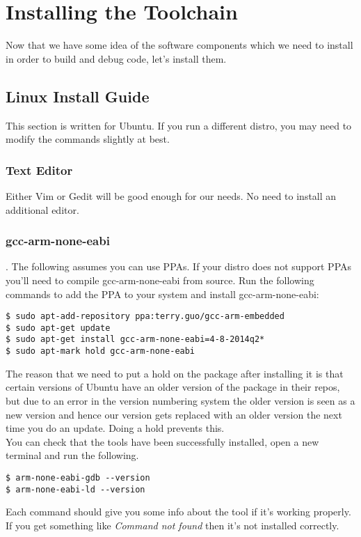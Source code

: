 \chapter{Installing the Toolchain}
Now that we have some idea of the software components which we need to install in order to build and debug code, let's install them.

\section{Linux Install Guide}
This section is written for Ubuntu. If you run a different distro, you may need to modify the commands slightly at best.
\subsection{Text Editor}
Either Vim or Gedit will be good enough for our needs. No need to install an additional editor.

\subsection{gcc-arm-none-eabi}.
The following assumes you can use PPAs. If your distro does not support PPAs you'll need to compile gcc-arm-none-eabi from source.
Run the following commands to add the PPA to your system and install gcc-arm-none-eabi:
\begin{lstlisting}[style=BashStyle]
$ sudo apt-add-repository ppa:terry.guo/gcc-arm-embedded
$ sudo apt-get update
$ sudo apt-get install gcc-arm-none-eabi=4-8-2014q2*
$ sudo apt-mark hold gcc-arm-none-eabi
\end{lstlisting}
The reason that we need to put a hold on the package after installing it is that certain versions of Ubuntu have an older version of the package in their repos, but due to an error in the version numbering system the older version is seen as a new version and hence our version gets replaced with an older version the next time you do an update. Doing a hold prevents this. \\

You can check that the tools have been successfully installed, open a new terminal and run the following. 
\begin{lstlisting}[style=BashStyle]
$ arm-none-eabi-gdb --version
$ arm-none-eabi-ld --version
\end{lstlisting}
Each command should give you some info about the tool if it's working properly. If you get something like \textit{Command not found} then it's not installed correctly.

